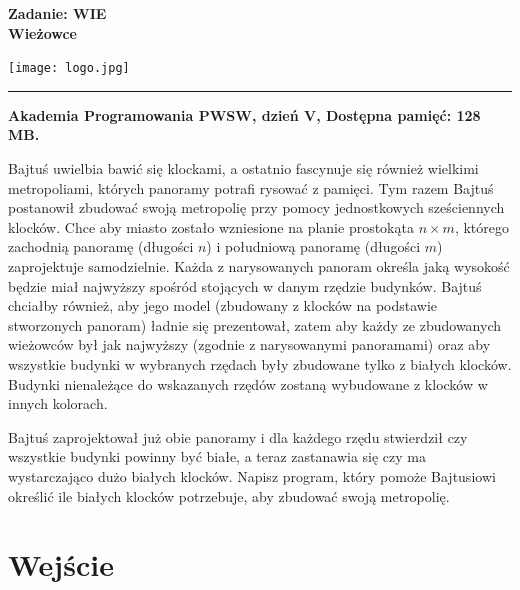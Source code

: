 \documentclass[10pt]{article}
\begin{document}
    

    \noindent
    \begin{minipage}{0.5\textwidth}
        \LARGE{\textsf{\textbf{Zadanie: WIE\\Wieżowce}}}
    \end{minipage}
    \begin{minipage}{0.5\textwidth}
        \begin{flushright}
            \texttt{[image: logo.jpg]}
        \end{flushright}
    \end{minipage}
    
    \noindent\rule{\textwidth}{0.4pt}
    
    \noindent\textbf{Akademia Programowania PWSW, dzień V, Dostępna pamięć: 128 MB.}
    \vspace{1em}
    
    
    \noindent
    Bajtuś uwielbia bawić się klockami, a ostatnio fascynuje się również wielkimi metropoliami, których panoramy potrafi rysować z pamięci. Tym razem Bajtuś postanowił zbudować swoją metropolię przy pomocy jednostkowych sześciennych klocków. Chce aby miasto zostało wzniesione na planie prostokąta $n\times m$, którego zachodnią panoramę (długości $n$) i południową panoramę (długości $m$) zaprojektuje samodzielnie. Każda z narysowanych panoram określa jaką wysokość będzie miał najwyższy spośród stojących w danym rzędzie budynków. Bajtuś chciałby również, aby jego model (zbudowany z klocków na podstawie stworzonych panoram) ładnie się prezentował, zatem aby każdy ze zbudowanych wieżowców był jak najwyższy (zgodnie z narysowanymi panoramami) oraz aby wszystkie budynki w wybranych rzędach były zbudowane tylko z białych klocków. Budynki nienależące do wskazanych rzędów zostaną wybudowane z klocków w innych kolorach.
    
    Bajtuś zaprojektował już obie panoramy i dla każdego rzędu stwierdził czy wszystkie budynki powinny być białe, a teraz zastanawia się czy ma wystarczająco dużo białych klocków. Napisz program, który pomoże Bajtusiowi określić ile białych klocków potrzebuje, aby zbudować swoją metropolię.


    \section*{Wejście}
    
\end{document}
